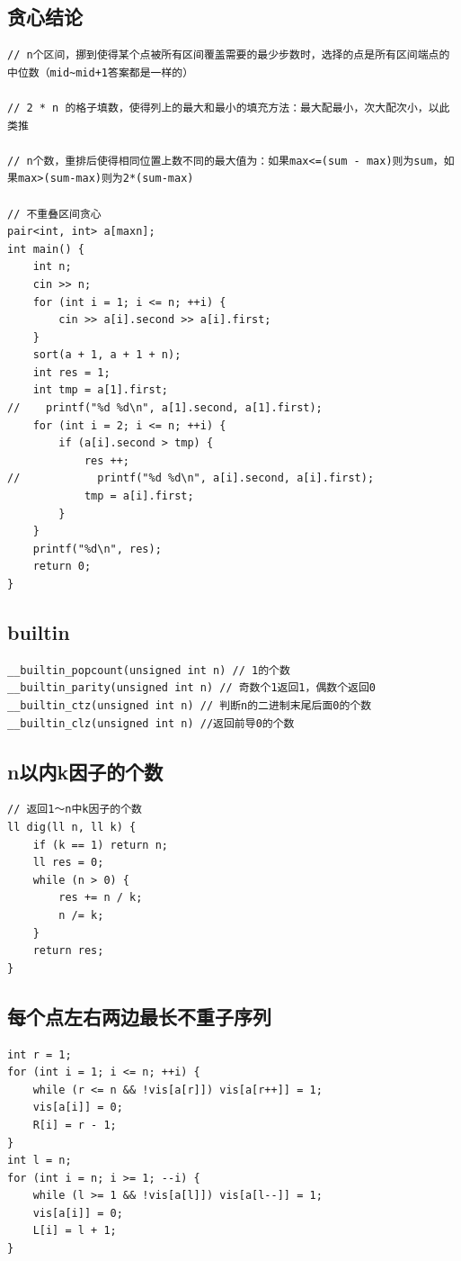 \documentclass[twoside]{article}
\begin{document}
\subsection{贪心结论}
\begin{lstlisting}
// n个区间，挪到使得某个点被所有区间覆盖需要的最少步数时，选择的点是所有区间端点的中位数（mid~mid+1答案都是一样的）

// 2 * n 的格子填数，使得列上的最大和最小的填充方法：最大配最小，次大配次小，以此类推

// n个数，重排后使得相同位置上数不同的最大值为：如果max<=(sum - max)则为sum，如果max>(sum-max)则为2*(sum-max)

// 不重叠区间贪心
pair<int, int> a[maxn];
int main() {
    int n;
    cin >> n;
    for (int i = 1; i <= n; ++i) {
        cin >> a[i].second >> a[i].first;
    }
    sort(a + 1, a + 1 + n);
    int res = 1;
    int tmp = a[1].first;
//    printf("%d %d\n", a[1].second, a[1].first);
    for (int i = 2; i <= n; ++i) {
        if (a[i].second > tmp) {
            res ++;
//            printf("%d %d\n", a[i].second, a[i].first);
            tmp = a[i].first;
        }
    }
    printf("%d\n", res);
    return 0;
}
\end{lstlisting}
\subsection{builtin}
\begin{lstlisting}
__builtin_popcount(unsigned int n) // 1的个数
__builtin_parity(unsigned int n) // 奇数个1返回1，偶数个返回0
__builtin_ctz(unsigned int n) // 判断n的二进制末尾后面0的个数
__builtin_clz(unsigned int n) //返回前导0的个数
\end{lstlisting}
\subsection{n以内k因子的个数}
\begin{lstlisting}
// 返回1～n中k因子的个数
ll dig(ll n, ll k) {
    if (k == 1) return n;
    ll res = 0;
    while (n > 0) {
        res += n / k;
        n /= k;
    }
    return res;
}
\end{lstlisting}
\subsection{每个点左右两边最长不重子序列}
\begin{lstlisting}
int r = 1;
for (int i = 1; i <= n; ++i) {
    while (r <= n && !vis[a[r]]) vis[a[r++]] = 1;
    vis[a[i]] = 0;
    R[i] = r - 1;
}
int l = n;
for (int i = n; i >= 1; --i) {
    while (l >= 1 && !vis[a[l]]) vis[a[l--]] = 1;
    vis[a[i]] = 0;
    L[i] = l + 1;
}\end{lstlisting}
\end{document}
